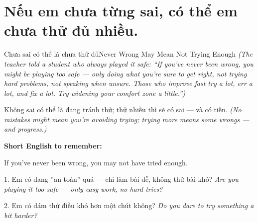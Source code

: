 \section{Nếu em chưa từng sai, có thể em chưa thử đủ nhiều.}
\begin{truyen}{Chưa sai có thể là chưa thử đủ}{Never Wrong May Mean Not Trying Enough}
\textit{(The teacher told a student who always played it safe: ``If you've never been wrong, you might be playing too safe — only doing what you're sure to get right, not trying hard problems, not speaking when unsure. Those who improve fast try a lot, err a lot, and fix a lot. Try widening your comfort zone a little.'')}
\end{truyen}

\begin{baihoc}
Không sai có thể là đang tránh thử; thử nhiều thì sẽ có sai — và có tiến.
\textit{(No mistakes might mean you're avoiding trying; trying more means some wrongs — and progress.)}
\end{baihoc}

\begin{ghinhoanh}
\textbf{Short English to remember:}

If you've never been wrong, you may not have tried enough.

\end{ghinhoanh}

\begin{tuhocnhanh}
1. Em có đang ''an toàn'' quá — chỉ làm bài dễ, không thử bài khó? \textit{Are you playing it too safe — only easy work, no hard tries?}

2. Em có dám thử điều khó hơn một chút không? \textit{Do you dare to try something a bit harder?}
\end{tuhocnhanh}
\ngancach
